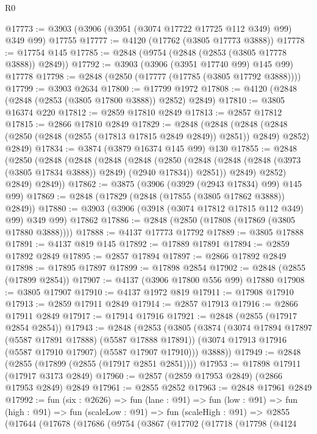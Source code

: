 \begin{lexlean}{R0}
\begin{coremodule}
@17773 := @3903 (@3906 (@3951 (@3074 @17722 @17725 @112 @349) @99) @349 @99) @17755
@17777 := @4120 (@17762 (@3805 @17773 @3888))
@17778 := @17754 @145
@17785 := @2848 (@9754 (@2848 (@2853 (@3805 @17778 @3888)) @2849))
@17792 := @3903 (@3906 (@3951 @17740 @99) @145 @99) @17778
@17798 := @2848 (@2850 (@17777 (@17785 (@3805 @17792 @3888))))
@17799 := @3903 @2634
@17800 := @17799 @1972
@17808 := @4120 (@2848 (@2848 (@2853 (@3805 @17800 @3888)) @2852) @2849)
@17810 := @3805 @16374 @220
@17812 := @2859 @17810 @2849
@17813 := @2857 @17812
@17815 := @2866 @17810 @2849
@17829 := @2848
    (@2848
      (@2848 (@2848 (@2850 (@2848 (@2855 (@17813 @17815 @2849 @2849)) @2851)) @2849) @2852)
      @2849)
@17834 := @3874 (@3879 @16374 @145 @99) @130
@17855 := @2848
    (@2850
      (@2848
        (@2848
          (@2848
            (@2848
              (@2850
                (@2848 (@2848 (@2848 (@3973 (@3805 @17834 @3888)) @2849) (@2940 @17834)) @2851))
              @2849)
            @2852)
          @2849)
        @2849))
@17862 := @3875 (@3906 (@3929 (@2943 @17834) @99) @145 @99)
@17869 := @2848 (@17829 (@2848 (@17855 (@3805 @17862 @3888)) @2849))
@17880 := @3903 (@3906 (@3918 (@3074 @17812 @17815 @112 @349) @99) @349 @99) @17862
@17886 := @2848 (@2850 (@17808 (@17869 (@3805 @17880 @3888))))
@17888 := @4137 @17773 @17792
@17889 := @3805 @17888
@17891 := @4137 @819 @145
@17892 := @17889 @17891
@17894 := @2859 @17892 @2849
@17895 := @2857 @17894
@17897 := @2866 @17892 @2849
@17898 := @17895 @17897
@17899 := @17898 @2854
@17902 := @2848 (@2855 (@17899 @2854))
@17907 := @4137 (@3906 @17800 @556 @99) @17880
@17908 := @3805 @17907
@17910 := @4137 @1972 @819
@17911 := @17908 @17910
@17913 := @2859 @17911 @2849
@17914 := @2857 @17913
@17916 := @2866 @17911 @2849
@17917 := @17914 @17916
@17921 := @2848 (@2855 (@17917 @2854 @2854))
@17943 := @2848
    (@2853
      (@3805
        (@3874
          (@3074 @17894 @17897 (@5587 @17891 @17888) (@5587 @17888 @17891))
          (@3074 @17913 @17916 (@5587 @17910 @17907) (@5587 @17907 @17910)))
        @3888))
@17949 := @2848 (@2855 (@17899 (@2855 (@17917 @2851 @2851))))
@17953 := @17898 @17911 (@17917 @3173 @2849)
@17960 := @2857 (@2859 @17953 @2849) (@2866 @17953 @2849) @2849
@17961 := @2855 @2852
@17963 := @2848 @17961 @2849
@17992 := fun (six : @2626) =>
  fun (lane : @91) =>
  fun (low : @91) =>
  fun (high : @91) =>
  fun (scaleLow : @91) =>
  fun (scaleHigh : @91) =>
  @2855
    (@17644
      (@17678
        (@17686
          (@9754
            (@3867
              (@17702
                (@17718
                  (@17798
                    (@4124

\end{coremodule}
\end{lexlean}
